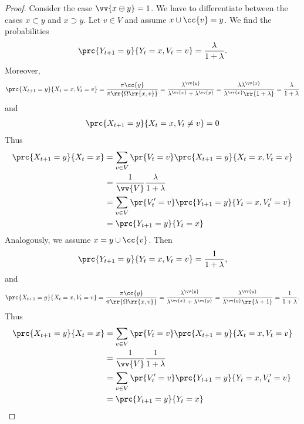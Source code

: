 \documentclass{article}
\begin{document}
\begin{claim*}[1]
\begin{proof}
    Consider the case $\vv{x\ominus y}=1$. We have to differentiate between the cases
    $x\subset y$ and $x\supset y$. Let $v\in V$ and assume $x\cup\cc{v}=y$. We find the probabilities
    \begin{align*}
      \prc{Y_{t+1}=y}{Y_t=x, V_t=v} = \frac{\lambda}{1+\lambda}.
    \end{align*}
    Moreover,
    \begin{align*}
      \prc{X_{t+1}=y}{X_t=x, V_t=v}
      = \frac{\pi\cc{y}}{\pi\rr{\Omega\rr{x,v}}}
      = \frac{\lambda^{\vv{y}}}{\lambda^{\vv{x}}+\lambda^{\vv{y}}}
      = \frac{\lambda\lambda^{\vv{x}}}{\lambda^{\vv{x}}\rr{1+\lambda}}
      = \frac{\lambda}{1+\lambda}
    \end{align*}
    and
    \begin{align*}
      \prc{X_{t+1}=y}{X_t=x, V_t\neq v} = 0
    \end{align*}
    Thus
    \begin{align*}
      \prc{X_{t+1}=y}{X_t=x} &= \sum_{v\in V} \pr{V_t=v}\prc{X_{t+1}=y}{X_t=x, V_t= v} \\
                             &= \frac{1}{\vv{V}} \frac{\lambda}{1+\lambda} \\
                             &= \sum_{v\in V} \pr{V'_t=v}\prc{Y_{t+1}=y}{Y_t=x, V'_t= v} \\
                             &=\prc{Y_{t+1}=y}{Y_t=x}
    \end{align*}
    Analogously, we assume $x=y\cup\cc{v}$. Then
    \begin{align*}
      \prc{Y_{t+1}=y}{Y_t=x, V_t=v} = \frac{1}{1+\lambda},
    \end{align*}
    and
    \begin{align*}
      \prc{X_{t+1}=y}{X_t=x, V_t=v}
      = \frac{\pi\cc{y}}{\pi\rr{\Omega\rr{x,v}}}
      = \frac{\lambda^{\vv{y}}}{\lambda^{\vv{x}}+\lambda^{\vv{y}}}
      = \frac{\lambda^{\vv{y}}}{\lambda^{\vv{y}}\rr{\lambda+1}}
      = \frac{1}{1+\lambda}.
    \end{align*}
    Thus
    \begin{align*}
      \prc{X_{t+1}=y}{X_t=x} &= \sum_{v\in V} \pr{V_t=v}\prc{X_{t+1}=y}{X_t=x, V_t= v} \\
                             &= \frac{1}{\vv{V}} \frac{1}{1+\lambda} \\
                             &= \sum_{v\in V} \pr{V'_t=v}\prc{Y_{t+1}=y}{Y_t=x, V'_t= v} \\
                             &=\prc{Y_{t+1}=y}{Y_t=x}
    \end{align*}


\end{proof}
\end{claim*}
\end{document}
